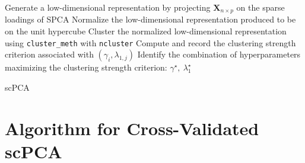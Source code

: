 \documentclass{article}
\begin{document}
\begin{algorithm}[!htbp]
{{      Generate a low-dimensional representation by projecting $\mathbf{X}_{n \times p}$ on the sparse loadings of SPCA\;
      Normalize the low-dimensional representation produced to be on the unit hypercube\;
      Cluster the normalized low-dimensional representation using \texttt{cluster\_meth} with \texttt{ncluster}\;
      Compute and record the clustering strength criterion associated with
      $(\gamma_i, \lambda_{1, j})$ \;
    }
  }
  Identify the combination of hyperparameters maximizing the clustering strength
  criterion: $\gamma^{\star},\: \lambda_1^{\star}$ \;
  \caption{scPCA}
\end{algorithm}


\newpage
\section{Algorithm for Cross-Validated scPCA}
\end{document}

